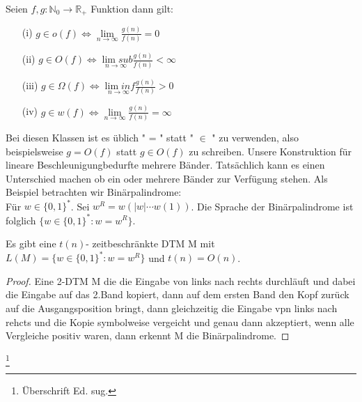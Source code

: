     Seien \(f, g : \mathbb{N}_0 \to \mathbb{R}_+\) Funktion dann gilt: 
    \begin{itemize}
        \item [(i)] \(g \in o(f) \Leftrightarrow \underset{n \to \infty}{\lim} \frac{g(n)}{f(n)} = 0\)
        \item [(ii)] \(g \in O(f) \Leftrightarrow \underset{n \to \infty}{\lim sub} \frac{g(n)}{f(n)} < \infty\)
        \item [(iii)] \(g \in \Omega(f) \Leftrightarrow \underset{n \to \infty}{\lim inf} \frac{g(n)}{f(n)} > 0\)
        \item [(iv)]\(g \in w(f) \Leftrightarrow \underset{n \to \infty}{\lim} \frac{g(n)}{f(n)} = \infty\)
    \end{itemize}
    Bei diesen Klassen ist es üblich " = " statt " \(\in\) " zu verwenden, also beispielsweise \(g = O(f)\) statt \(g \in O(f)\) zu schreiben.
    \medskip
    Unsere Konstruktion für lineare Beschleunigungbedurfte mehrere Bänder. Tatsächlich kann es einen Unterschied machen ob ein oder mehrere Bänder zur Verfügung stehen. Als Beispiel betrachten wir Binärpalindrome:\\ Für \(w \in \{0, 1\}^*\). Sei \(w^R = w(|w| \cdots w(1))\). Die Sprache der Binärpalindrome ist folglich \(\{w \in \{0, 1\}^* : w = w^R \}\).

    Es gibt eine \(t(n)\)- zeitbeschränkte DTM M mit \(L(M) = \{w \in \{0, 1\}^* : w = w^R\}\) und \(t(n) = O(n)\).
    \begin{proof}
        Eine 2-DTM M die die Eingabe von links nach rechts durchläuft und dabei die Eingabe auf das 2.Band kopiert, dann auf dem ersten Band den Kopf zurück auf die Ausgangsposition bringt, dann gleichzeitig die Eingabe vpn links nach rehcts und die Kopie symbolweise vergeicht und genau dann akzeptiert, wenn alle Vergleiche positiv waren, dann erkennt M die Binärpalindrome.
    \end{proof}
    \footnote{Überschrift Ed. sug.}

